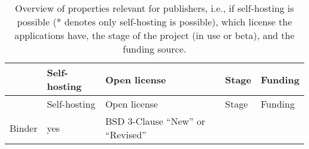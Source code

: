 \documentclass[onecolumn]{article}
\begin{document}
\begin{longtable}[]{@{}lllll@{}}
\caption{Overview of properties relevant for publishers, i.e., if
self-hosting is possible (* denotes only self-hosting is possible),
which license the applications have, the stage of the project (in use or
beta), and the funding source.}\tabularnewline
\toprule
\begin{minipage}[b]{0.11\columnwidth}\raggedright
\strut
\end{minipage} & \begin{minipage}[b]{0.11\columnwidth}\raggedright
Self-hosting\strut
\end{minipage} & \begin{minipage}[b]{0.17\columnwidth}\raggedright
Open license\strut
\end{minipage} & \begin{minipage}[b]{0.17\columnwidth}\raggedright
Stage\strut
\end{minipage} & \begin{minipage}[b]{0.29\columnwidth}\raggedright
Funding\strut
\end{minipage}\tabularnewline
\midrule
\endfirsthead
\toprule
\begin{minipage}[b]{0.11\columnwidth}\raggedright
\strut
\end{minipage} & \begin{minipage}[b]{0.11\columnwidth}\raggedright
Self-hosting\strut
\end{minipage} & \begin{minipage}[b]{0.17\columnwidth}\raggedright
Open license\strut
\end{minipage} & \begin{minipage}[b]{0.17\columnwidth}\raggedright
Stage\strut
\end{minipage} & \begin{minipage}[b]{0.29\columnwidth}\raggedright
Funding\strut
\end{minipage}\tabularnewline
\midrule
\endhead
\begin{minipage}[t]{0.11\columnwidth}\raggedright
Binder\strut
\end{minipage} & \begin{minipage}[t]{0.11\columnwidth}\raggedright
yes\strut
\end{minipage} & \begin{minipage}[t]{0.17\columnwidth}\raggedright
BSD 3-Clause ``New'' or ``Revised''\strut
\end{minipage} & \begin{minipage}[t]{0.17\columnwidth}\raggedright

\end{minipage}
\end{longtable}
\end{document}
